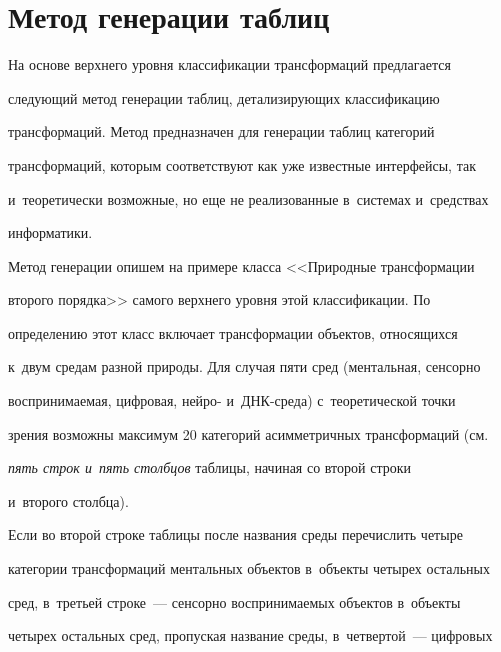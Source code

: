   

\vspace*{-3.5pt}

  

\section{Метод генерации таблиц}



\vspace*{-3pt}



  На основе верхнего уровня классификации трансформаций предлагается 

следующий метод генерации таблиц, детализирующих классификацию 

трансформаций. Метод предназначен для генерации таблиц категорий 

трансформаций, которым соответствуют как уже известные интерфейсы, так 

и~теоретически возможные, но еще не реализованные в~системах и~средствах 

информатики.

  

  Метод генерации опишем на примере класса <<Природные трансформации 

второго порядка>> самого верхнего уровня этой классификации. По 

определению этот класс включает трансформации объектов, относящихся 

к~двум средам разной природы. Для случая пяти сред (ментальная, сенсорно 

воспринимаемая, цифровая, нейро- и~ДНК-сре\-да) с~теоретической точки 

зрения возможны максимум 20 категорий асимметричных трансформаций (см.\ 

\textit{пять строк и~пять столбцов} таблицы, начиная со второй строки 

и~второго столбца).

  

  Если во второй строке таблицы после названия среды перечислить \mbox{четыре} 

категории трансформаций ментальных объектов в~объекты четырех остальных 

сред, в~третьей строке~--- сенсорно воспринимаемых объектов в~объекты 

четырех остальных сред, пропуская название среды, в~четвертой~--- циф\-ро\-вых 

